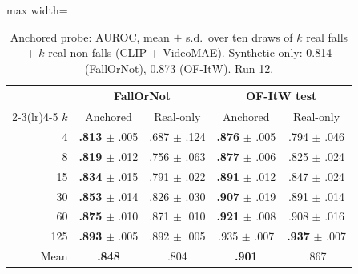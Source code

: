 \documentclass[10pt,twocolumn,letterpaper]{article}
\begin{document}
\begin{table}[t]\centering\small
\caption{Anchored probe: AUROC, mean $\pm$ s.d.\ over ten draws of $k$ real falls + $k$ real non-falls (CLIP + VideoMAE). Synthetic-only: 0.814 (FallOrNot), 0.873 (OF-ItW). Run 12.}
\label{tab:anchor}
\setlength\tabcolsep{3pt}
\begin{adjustbox}{max width=\linewidth}
\begin{tabular}{rcccc}\toprule
 & \multicolumn{2}{c}{FallOrNot} & \multicolumn{2}{c}{OF-ItW test}\\\cmidrule(lr){2-3}\cmidrule(lr){4-5}
$k$ & Anchored & Real-only & Anchored & Real-only\\\midrule
4 & \textbf{.813} $\pm$ .005 & .687 $\pm$ .124 & \textbf{.876} $\pm$ .005 & .794 $\pm$ .046\\
8 & \textbf{.819} $\pm$ .012 & .756 $\pm$ .063 & \textbf{.877} $\pm$ .006 & .825 $\pm$ .024\\
15 & \textbf{.834} $\pm$ .015 & .791 $\pm$ .022 & \textbf{.891} $\pm$ .012 & .847 $\pm$ .024\\
30 & \textbf{.853} $\pm$ .014 & .826 $\pm$ .030 & \textbf{.907} $\pm$ .019 & .891 $\pm$ .014\\
60 & \textbf{.875} $\pm$ .010 & .871 $\pm$ .010 & \textbf{.921} $\pm$ .008 & .908 $\pm$ .016\\
125 & \textbf{.893} $\pm$ .005 & .892 $\pm$ .005 & .935 $\pm$ .007 & \textbf{.937} $\pm$ .007\\\midrule
Mean & \textbf{.848} & .804 & \textbf{.901} & .867\\\bottomrule
\end{tabular}
\end{adjustbox}
\end{table}
\end{document}
